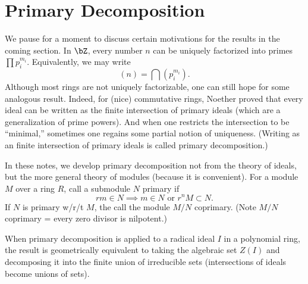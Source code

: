 \section{Primary Decomposition}

We pause for a moment to discuss certain motivations for the results in the coming section. In $\bZ$, every number $n$ can be uniquely factorized into primes $\prod p_i^{m_i}$. Equivalently, we may write
\[
    (n) = \bigcap \left( p_i^{m_i} \right).
\]
Although most rings are not uniquely factorizable, one can still hope for some analogous result. Indeed, for (nice) commutative rings, Noether proved that every ideal can be written as the finite intersection of primary ideals (which are a generalization of prime powers). And when one restricts the intersection to be ``minimal,'' sometimes one regains some partial notion of uniqueness. (Writing as an finite intersection of primary ideals is called primary decomposition.)

In these notes, we develop primary decomposition not from the theory of ideals, but the more general theory of modules (because it is convenient). For a module $M$ over a ring $R$, call a submodule $N$ primary if
\[
    rm \in N \implies m \in N \text{ or } r^nM \subset N.
\]
If $N$ is primary w/r/t $M$, the call the module $M/N$ coprimary. (Note $M/N$ coprimary = every zero divisor is nilpotent.)

When primary decomposition is applied to a radical ideal $I$ in a polynomial ring, the result is geometrically equivalent to taking the algebraic set $Z(I)$ and decomposing it into the finite union of irreducible sets (intersections of ideals become unions of sets).

